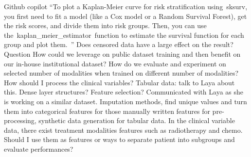 \documentclass{article}%
\begin{document}
\newline%
\newline%
%
Github copilot “To plot a Kaplan{-}Meier curve for risk stratification using~sksurv, you first need to fit a model (like a Cox model or a Random Survival Forest), get the risk scores, and divide them into risk groups. Then, you can use the~kaplan\_meier\_estimator~function to estimate the survival function for each group and plot them.~”%
\newline%
\newline%
%
%
\newline%
\newline%
%
Does censored data have a large effect on the result? %
\newline%
\newline%
%
Question%
\newline%
\newline%
%
How could we leverage on public dataset training and then benefit on our in{-}house institutional dataset? %
\newline%
\newline%
%
How do we evaluate and experiment on selected number of modalities when trained on different number of modalities? %
\newline%
\newline%
%
%
\newline%
\newline%
%
How should I process the clinical variables? %
\newline%
\newline%
%
Tabular data: talk to Laya about this. %
\newline%
\newline%
%
Dense layer structures? %
\newline%
\newline%
%
Feature selection? %
\newline%
\newline%
%
Communicated with Laya as she is working on a similar dataset.%
\newline%
\newline%
%
Imputation methods, find unique values and turn them into categorical features for those manually written features for pre{-}processing, synthetic data generation for tabular data.%
\newline%
\newline%
%
In the clinical variable data, there exist treatment modalities features such as radiotherapy and chemo. Should I use them as features or ways to separate patient into subgroups and evaluate performances? %
\end{document}
